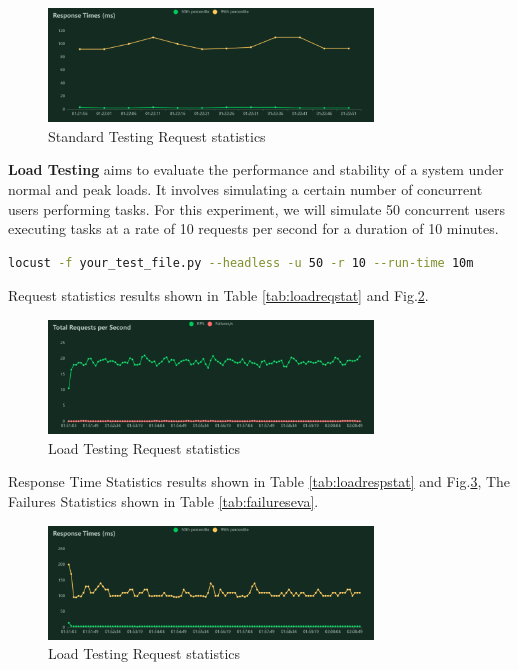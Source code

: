 \documentclass[journal]{IEEEtran}
\begin{document}
\begin{figure}[h]
  \centering
  \includegraphics[width=3.4in]{figures/stdrespstat.png}
  \caption{Standard Testing Request statistics}
  \label{fig:stdrespstat}
  \end{figure}

\textbf{Load Testing} aims to evaluate the performance and stability of a system under normal and peak loads. It involves simulating a certain number of concurrent users performing tasks. For this experiment, we will simulate 50 concurrent users executing tasks at a rate of 10 requests per second for a duration of 10 minutes. 
\begin{lstlisting}[label={lst:locustcmd2},language=BASH,breaklines=true]
locust -f your_test_file.py --headless -u 50 -r 10 --run-time 10m 
\end{lstlisting}

Request statistics results shown in Table \ref{tab:loadreqstat} and Fig.\ref{fig:loadreqstat}.

\begin{figure}[h]
  \centering
  \includegraphics[width=3.4in]{figures/loadreqstat.png}
  \caption{Load Testing Request statistics}
  \label{fig:loadreqstat}
  \end{figure}



Response Time Statistics results shown in Table \ref{tab:loadrespstat} and Fig.\ref{fig:loadrespstat}, The Failures Statistics shown in Table \ref{tab:failureseva}.


\begin{figure}[h]
  \centering
  \includegraphics[width=3.4in]{figures/loadrespstat.png}
  \caption{Load Testing Request statistics}
  \label{fig:loadrespstat}
  \end{figure}
\end{document}
